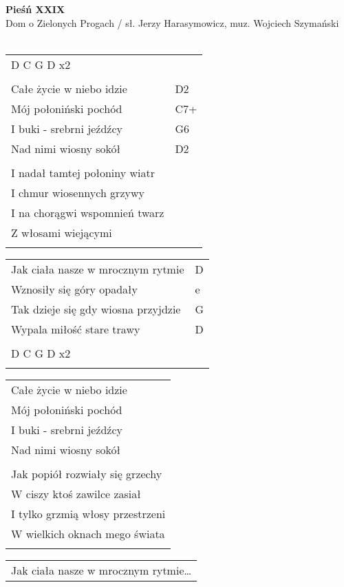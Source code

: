 \documentclass[a5paper]{article}
\begin{document}


\noindent
\fontsize{12pt}{15pt}\selectfont
\textbf{Pieśń XXIX} \\
\fontsize{8pt}{10pt}\selectfont
Dom o Zielonych Progach / sł. Jerzy Harasymowicz, muz. Wojciech Szymański \\ \\
\fontsize{10pt}{12pt}\selectfont
{}
\begin{tabular}{@{}p{8.00cm}p{3cm}@{}}
\noindent
D C G D x2 & \\ \\
Całe życie w niebo idzie & D2 \\
Mój połoniński pochód & C7+ \\
I buki - srebrni jeźdźcy & G6 \\
Nad nimi wiosny sokół & D2 \\ \\
I nadał tamtej połoniny wiatr & \\
I chmur wiosennych grzywy & \\
I na chorągwi wspomnień twarz & \\
Z włosami wiejącymi & \\ \\
\end{tabular}

\noindent
\begin{tabular}{@{}p{7.00cm}p{3cm}@{}}
Jak ciała nasze w mrocznym rytmie & D \\
Wznosiły się góry opadały & e \\
Tak dzieje się gdy wiosna przyjdzie & G \\
Wypala miłość stare trawy & D \\ \\
D C G D x2 & \\ \\
\end{tabular}

\noindent
\begin{tabular}{@{}p{8.00cm}@{}}
Całe życie w niebo idzie \\
Mój połoniński pochód \\
I buki - srebrni jeźdźcy \\
Nad nimi wiosny sokół \\ \\
Jak popiół rozwiały się grzechy \\
W ciszy ktoś zawilce zasiał \\
I tylko grzmią włosy przestrzeni \\
W wielkich oknach mego świata \\ \\
\end{tabular}

\noindent
\begin{tabular}{@{}p{7.00cm}@{}}
Jak ciała nasze w mrocznym rytmie…
\end{tabular}
\end{document}

